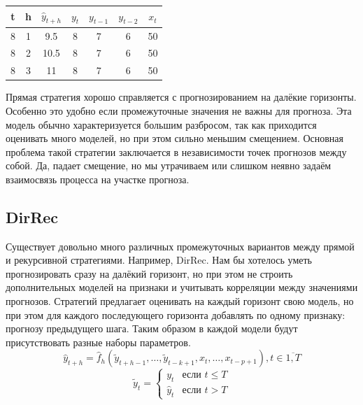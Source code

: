 \documentclass[12pt,fleqn]{article}
\begin{document}
\begin{table}[!ht]
  \centering
  \begin{tabular}{|cc|ccccc|}
    \hline
    t & h & $\hat{y}_{t+h}$ & $y_t$ & $y_{t-1}$ & $y_{t-2}$ & $x_{t}$ \\ \hline
    8 & 1 & 9.5             & 8     & 7         & 6         & 50      \\
    8 & 2 & 10.5            & 8     & 7         & 6         & 50      \\
    8 & 3 & 11              & 8     & 7         & 6         & 50      \\ \hline
  \end{tabular}
\end{table}

Прямая стратегия хорошо справляется с прогнозированием на далёкие горизонты.
Особенно это удобно если промежуточные значения не важны для прогноза.
Эта модель обычно характеризуется большим разбросом, так как приходится оценивать много моделей, но при этом сильно меньшим смещением.
Основная проблема такой стратегии заключается в независимости точек прогнозов между собой.
Да, падает смещение, но мы утрачиваем или слишком неявно задаём взаимосвязь процесса на участке прогноза.
\subsection{DirRec}

Существует довольно много различных промежуточных вариантов между прямой и рекурсивной стратегиями.
Например, DirRec.
Нам бы хотелось уметь прогнозировать сразу на далёкий горизонт, но при этом не строить дополнительных моделей на признаки и учитывать корреляции между значениями прогнозов.
Стратегий предлагает оценивать на каждый горизонт свою модель, но при этом для каждого последующего горизонта добавлять по одному признаку: прогнозу предыдущего шага.
Таким образом в каждой модели будут присутствовать разные наборы параметров.
\begin{equation}
  \hat{y}_{t+h} = \hat{f}_h(\tilde{y}_{t+h-1}, \ldots, \tilde{y}_{t-k+1}, x_{t}, \ldots, x_{t-p+1}), t \in \overline{1, T}
\end{equation}
\begin{equation}
  \tilde{y}_t =
  \begin{cases}
    y_t & \text{если } t \leq T  \\
    \hat{y}_t & \text{если } t > T
  \end{cases}
\end{equation}
\end{document}
